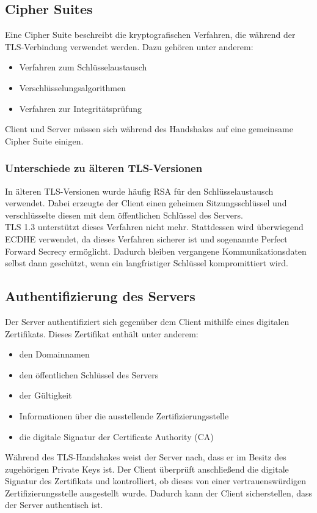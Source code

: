 \subsection*{Cipher Suites}
Eine Cipher Suite beschreibt die kryptografischen Verfahren, die während der TLS-Verbindung verwendet werden. Dazu gehören unter anderem:
\begin{itemize}
  \item Verfahren zum Schlüsselaustausch
  \item Verschlüsselungsalgorithmen
  \item Verfahren zur Integritätsprüfung
\end{itemize}
Client und Server müssen sich während des Handshakes auf eine gemeinsame Cipher Suite einigen.

\subsubsection*{Unterschiede zu älteren TLS-Versionen}
In älteren TLS-Versionen wurde häufig RSA für den Schlüsselaustausch verwendet. Dabei erzeugte der Client einen geheimen Sitzungsschlüssel und verschlüsselte diesen mit dem öffentlichen Schlüssel des Servers. \\
TLS 1.3 unterstützt dieses Verfahren nicht mehr. Stattdessen wird überwiegend ECDHE verwendet, da dieses Verfahren sicherer ist und sogenannte Perfect Forward Secrecy ermöglicht. Dadurch bleiben vergangene Kommunikationsdaten selbst dann geschützt, wenn ein langfristiger Schlüssel kompromittiert wird.

\subsection*{Authentifizierung des Servers}
Der Server authentifiziert sich gegenüber dem Client mithilfe eines digitalen Zertifikats. Dieses Zertifikat enthält unter anderem:
\begin{itemize}
  \item den Domainnamen
  \item den öffentlichen Schlüssel des Servers
  \item der Gültigkeit
  \item Informationen über die ausstellende Zertifizierungsstelle
  \item die digitale Signatur der Certificate Authority (CA)
\end{itemize}
Während des TLS-Handshakes weist der Server nach, dass er im Besitz des zugehörigen Private Keys ist. Der Client überprüft anschließend die digitale Signatur des Zertifikats und kontrolliert, ob dieses von einer vertrauenswürdigen Zertifizierungsstelle ausgestellt wurde. Dadurch kann der Client sicherstellen, dass der Server authentisch ist.

